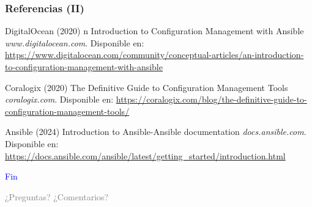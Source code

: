 \documentclass[
	11pt, %
]{beamer}
\begin{document}
\begin{frame} %
	\frametitle{Referencias (II)}
	
	\begin{thebibliography}{99} %
		\footnotesize %
		
				DigitalOcean (2020)
                n {I}ntroduction to {C}onfiguration {M}anagement with {A}nsible
                \newblock \emph{www.digitalocean.com}. Disponible en: \url{https://www.digitalocean.com/community/conceptual-articles/an-introduction-to-configuration-management-with-ansible}
   
                Coralogix (2020)
                \newblock The Definitive Guide to Configuration Management Tools
                \newblock \emph{coralogix.com}. Disponible en: \url{https://coralogix.com/blog/the-definitive-guide-to-configuration-management-tools/}
            
                Ansible (2024)
                \newblock Introduction to Ansible-Ansible documentation
                \newblock \emph{docs.ansible.com}. Disponible en: \url{https://docs.ansible.com/ansible/latest/getting_started/introduction.html}

	\end{thebibliography}
\end{frame}


\begin{frame}[plain]
	\begin{center}
		{\Huge \textcolor{blue}{Fin}}
		
		\bigskip\bigskip
		
		{\LARGE \textcolor{gray}{¿Preguntas? ¿Comentarios?}}
	\end{center}
\end{frame}

\end{document}
